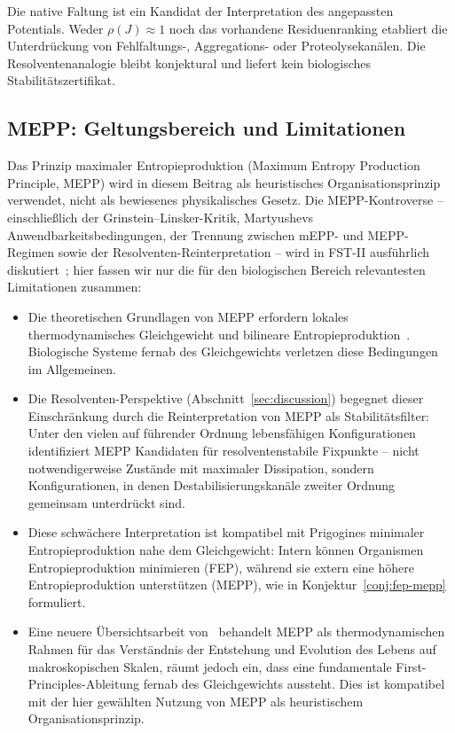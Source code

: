 \documentclass[12pt,a4paper]{article}
\theoremstyle{remark}
\begin{document}
Die native Faltung ist ein Kandidat der Interpretation des angepassten Potentials. Weder $\rho(J)\approx1$ noch das vorhandene Residuenranking etabliert die Unterdrückung von Fehlfaltungs-, Aggregations- oder Proteolysekanälen. Die Resolventenanalogie bleibt konjektural und liefert kein biologisches Stabilitätszertifikat.

\subsection{MEPP: Geltungsbereich und Limitationen}

Das Prinzip maximaler Entropieproduktion (Maximum Entropy Production Principle, MEPP) wird in diesem Beitrag als heuristisches Organisationsprinzip verwendet, nicht als bewiesenes physikalisches Gesetz. Die MEPP-Kontroverse -- einschließlich der Grinstein--Linsker-Kritik, Martyushevs Anwendbarkeitsbedingungen, der Trennung zwischen mEPP- und MEPP-Regimen sowie der Resolventen-Reinterpretation -- wird in FST-II ausführlich diskutiert~\citep{FSTII}; hier fassen wir nur die für den biologischen Bereich relevantesten Limitationen zusammen:
\begin{itemize}
\item Die theoretischen Grundlagen von MEPP erfordern lokales thermodynamisches Gleichgewicht und bilineare Entropieproduktion~\citep{Martyushev2010}. Biologische Systeme fernab des Gleichgewichts verletzen diese Bedingungen im Allgemeinen.
\item Die Resolventen-Perspektive (Abschnitt~\ref{sec:discussion}) begegnet dieser Einschränkung durch die Reinterpretation von MEPP als Stabilitätsfilter: Unter den vielen auf führender Ordnung lebensfähigen Konfigurationen identifiziert MEPP Kandidaten für resolventenstabile Fixpunkte -- nicht notwendigerweise Zustände mit maximaler Dissipation, sondern Konfigurationen, in denen Destabilisierungskanäle zweiter Ordnung gemeinsam unterdrückt sind.
\item Diese schwächere Interpretation ist kompatibel mit Prigogines minimaler Entropieproduktion nahe dem Gleichgewicht: Intern können Organismen Entropieproduktion minimieren (FEP), während sie extern eine höhere Entropieproduktion unterstützen (MEPP), wie in Konjektur~\ref{conj:fep-mepp} formuliert.
\item Eine neuere Übersichtsarbeit von~\citet{Toma2025} behandelt MEPP als thermodynamischen Rahmen für das Verständnis der Entstehung und Evolution des Lebens auf makroskopischen Skalen, räumt jedoch ein, dass eine fundamentale First-Principles-Ableitung fernab des Gleichgewichts aussteht. Dies ist kompatibel mit der hier gewählten Nutzung von MEPP als heuristischem Organisationsprinzip.
\end{itemize}
\end{document}
